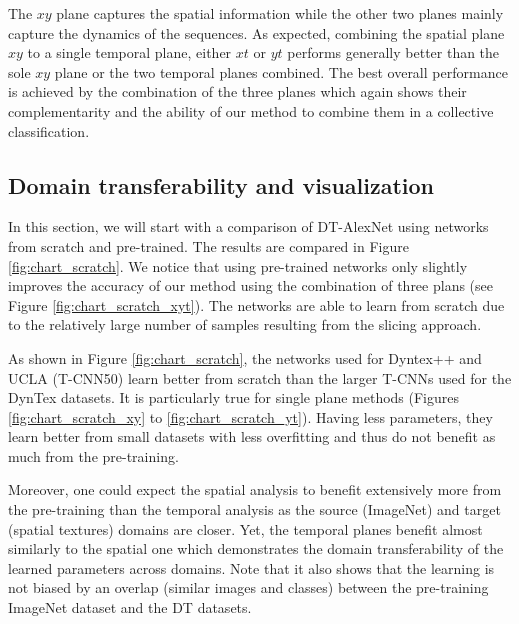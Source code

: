 \documentclass[a4paper,11pt]{article}
\begin{document}
The $xy$ plane captures the spatial information while the other two planes mainly capture the dynamics of the sequences.
As expected, combining the spatial plane $xy$ to a single temporal plane, either $xt$ or $yt$ performs generally better than the sole $xy$ plane or the two temporal planes combined.
The best overall performance is achieved by the combination of the three planes which again shows their complementarity and the ability of our method to combine them in a collective classification.

\subsection{Domain transferability and visualization}\leavevmode \par
In this section, we will start with a comparison of DT-AlexNet using networks from scratch and pre-trained. The results are compared in Figure \ref{fig:chart_scratch}.
We notice that using pre-trained networks only slightly improves the accuracy of our method using the combination of three plans (see Figure \ref{fig:chart_scratch_xyt}).
The networks are able to learn from scratch due to the relatively large number of samples resulting from the slicing approach.

As shown in Figure \ref{fig:chart_scratch}, the networks used for Dyntex++ and UCLA (T-CNN50) learn better from scratch than the larger T-CNNs used for the DynTex datasets.
It is particularly true for single plane methods (Figures \ref{fig:chart_scratch_xy} to \ref{fig:chart_scratch_yt}).
Having less parameters, they learn better from small datasets with less overfitting and thus do not benefit as much from the pre-training.

Moreover, one could expect the spatial analysis to benefit extensively more from the pre-training than the temporal analysis
as the source (ImageNet) and target (spatial textures) domains are closer.
Yet, the temporal planes benefit almost similarly to the spatial one which demonstrates
the domain transferability of the learned parameters across domains.
Note that it also shows that the learning is not biased by an overlap (similar images and classes) between the pre-training ImageNet dataset and the  
DT datasets.
\end{document}
